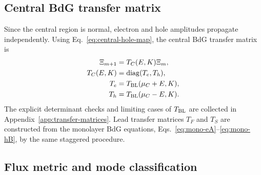 \subsection{Central BdG transfer matrix}
\label{subsec:central-transfer}

Since the central region is normal, electron and hole amplitudes propagate independently.  Using Eq.~\eqref{eq:central-hole-map}, the central BdG transfer matrix is
\begin{align}
    \Xi_{m+1}
    &=
    T_C(E,K)\Xi_m,
    \label{eq:central-transfer-recurrence}\\
    T_C(E,K)
    &=
    \operatorname{diag}(T_e,T_h),
    \label{eq:central-transfer}\\
    T_e&=T_{\rm BL}(\mu_C+E,K),
    \\
    T_h&=T_{\rm BL}(\mu_C-E,K).
    \notag
\end{align}
The explicit determinant checks and limiting cases of $T_{\rm BL}$ are collected in Appendix~\ref{app:transfer-matrices}.  Lead transfer matrices $T_F$ and $T_S$ are constructed from the monolayer BdG equations, Eqs.~\eqref{eq:mono-eA}--\eqref{eq:mono-hB}, by the same staggered procedure.

\subsection{Flux metric and mode classification}
\label{subsec:flux-mode-classification}

